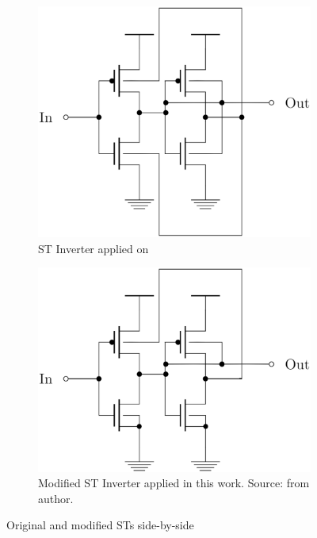 \documentclass[ecp,tc, english]{iiufrgs}
\begin{document}
\begin{figure}[H]
\centering
\begin{subfigure}{.5\textwidth}
  \centering
  \includegraphics[width=.8\linewidth]{STOriginal.eps}
  \caption{ST Inverter applied on \citet{dokania2015circuit}}
  \label{fig:sub1}
\end{subfigure}%
\begin{subfigure}{.5\textwidth}
  \centering
  \includegraphics[width=.8\linewidth]{STcorrigido.eps}
  \caption{Modified ST Inverter applied in this work. Source: from author.}
  \label{fig:sub2}
\end{subfigure}
\caption{Original and modified STs side-by-side}
\label{fig:test}
\end{figure}
\end{document}
